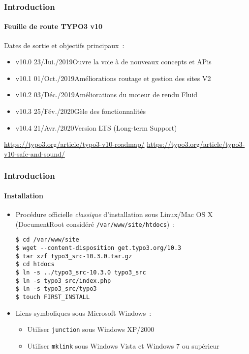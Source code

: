 
\begin{frame}[fragile]
	\frametitle{Introduction}
	\framesubtitle{Feuille de route TYPO3 v10}

	Dates de sortie et objectifs principaux~:

	\begin{itemize}

		\item v10.0 \tabto{1.1cm}23/Jui./2019\tabto{3.4cm}Ouvre la voie à de nouveaux concepts et APis
		\item v10.1 \tabto{1.1cm}01/Oct./2019\tabto{3.4cm}Améliorations routage et gestion des sites V2
		\item v10.2 \tabto{1.1cm}03/Déc./2019\tabto{3.4cm}Améliorations du moteur de rendu Fluid
		\item
			\begingroup
				\color{typo3orange}
				v10.3 \tabto{1.1cm}25/Fév./2020\tabto{3.4cm}Gèle des fonctionnalités
			\endgroup
		\item v10.4 \tabto{1.1cm}21/Avr./2020\tabto{3.4cm}Version LTS (Long-term Support)

	\end{itemize}

	\vspace{0.6cm}
	\smaller
		\url{https://typo3.org/article/typo3-v10-roadmap/}\newline
		\url{https://typo3.org/article/typo3-v10-safe-and-sound/}
	\normalsize

\end{frame}


\begin{frame}[fragile]
	\frametitle{Introduction}
	\framesubtitle{Installation}

	\begin{itemize}
		\item Procédure officielle \textit{classique} d'installation sous Linux/Mac OS X\newline
			(DocumentRoot considéré \texttt{/var/www/site/htdocs})~:
\begin{lstlisting}
$ cd /var/www/site
$ wget --content-disposition get.typo3.org/10.3
$ tar xzf typo3_src-10.3.0.tar.gz
$ cd htdocs
$ ln -s ../typo3_src-10.3.0 typo3_src
$ ln -s typo3_src/index.php
$ ln -s typo3_src/typo3
$ touch FIRST_INSTALL
\end{lstlisting}

		\item Liens symboliques sous Microsoft Windows~:

			\begin{itemize}
				\item Utiliser \texttt{junction} sous Windows XP/2000
				\item Utiliser \texttt{mklink} sous Windows Vista et Windows 7 ou supérieur
			\end{itemize}

	\end{itemize}
\end{frame}

